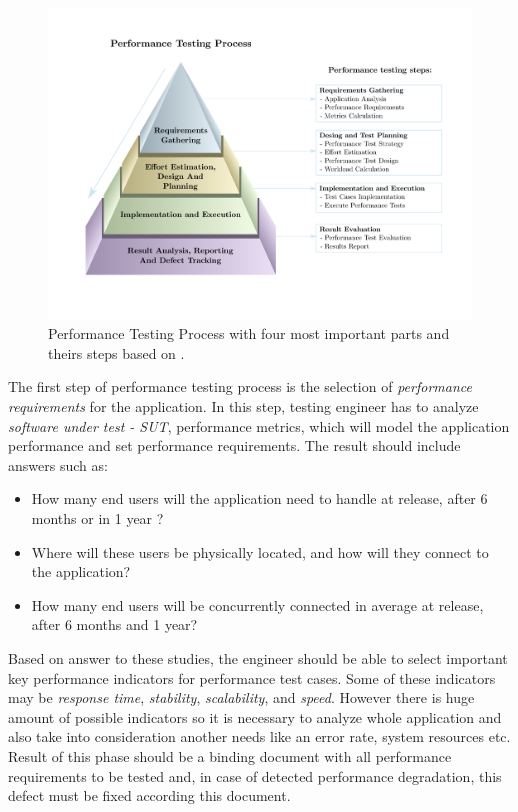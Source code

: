 \begin{figure}[H]
  \centering
  \includegraphics[width=16cm]{obrazky-figures/pyramid.pdf}
  \captionsetup{justification=centering}
  \caption{Performance Testing Process with four most important parts and theirs steps based on \cite{Sharma:HP}.}
  \label{fig:performace_testing_process}
\end{figure}

The first step of performance testing process is the selection of \emph{performance requirements} for the application. In this step, testing engineer has to analyze \emph{software under test - SUT}, performance metrics, which will model the application performance and set performance requirements. The result should include answers such as:

\begin{itemize}
	\setlength\itemsep{0em}
	\item How many end users will the application need to handle at release, after 6 months or in 1 year ?
	\item Where will these users be physically located, and how will they connect to the application?
	\item How many end users will be concurrently connected in average at release, after 6 months and 1 year?
\end{itemize}

Based on answer to these studies, the engineer should be able to select important key performance indicators for performance test cases. Some of these indicators may be \emph{response time}, \emph{stability}, \emph{scalability}, and \emph{speed}. However there is huge amount of possible indicators so it is necessary to analyze whole application and also take into consideration another needs like an error rate, system resources etc.  Result of this phase should be a binding document with all performance requirements to be tested and, in case of detected performance degradation, this defect must be fixed according this document.

